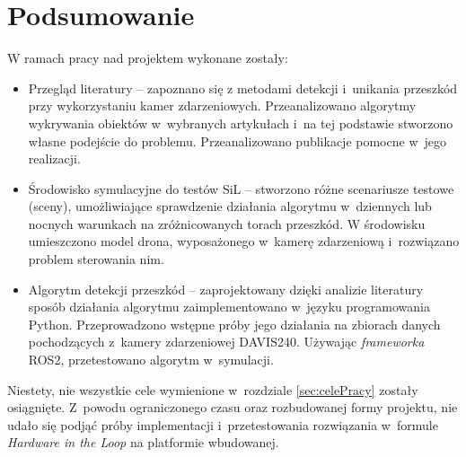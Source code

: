 \chapter{Podsumowanie}
\label{cha:podsumowanie}


W ramach pracy nad projektem wykonane zostały:
\begin{itemize}
    \item Przegląd literatury -- zapoznano się z metodami detekcji i~unikania przeszkód przy wykorzystaniu kamer zdarzeniowych. Przeanalizowano algorytmy wykrywania obiektów w~wybranych artykułach i~na tej podstawie stworzono własne podejście do problemu. Przeanalizowano publikacje pomocne w~jego realizacji.
    \item Środowisko symulacyjne do testów SiL -- stworzono różne scenariusze testowe (sceny), umożliwiające sprawdzenie działania algorytmu w~dziennych lub nocnych warunkach na zróżnicowanych torach przeszkód. W środowisku umieszczono model drona, wyposażonego w~kamerę zdarzeniową i~rozwiązano problem sterowania nim.
    \item Algorytm detekcji przeszkód -- zaprojektowany dzięki analizie literatury sposób działania algorytmu zaimplementowano w~języku programowania Python. Przeprowadzono wstępne próby jego działania na zbiorach danych pochodzących z~kamery zdarzeniowej DAVIS240. Używając \textit{frameworka} ROS2, przetestowano algorytm w~symulacji.
\end{itemize}


\vspace{11px}
Niestety, nie wszystkie cele wymienione w~rozdziale \ref{sec:celePracy} zostały osiągnięte. Z~powodu ograniczonego czasu oraz rozbudowanej formy projektu, nie udało się podjąć próby implementacji i~przetestowania rozwiązania w~formule \textit{Hardware in the Loop} na platformie wbudowanej.


